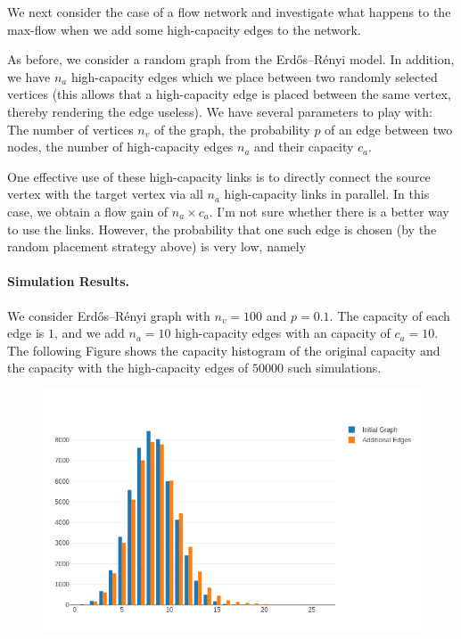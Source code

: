 
We next consider the case of a flow network and investigate what happens to the max-flow when we add some high-capacity edges to the network.

As before, we consider a random graph from the Erdős–Rényi model. In addition, we have $n_a$ high-capacity edges which we place between two randomly selected vertices (this allows that a high-capacity edge is placed between the same vertex, thereby rendering the edge useless). We have several parameters to play with: The number of vertices $n_v$ of the graph, the probability $p$ of an edge between two nodes, the number of high-capacity edges $n_a$ and their capacity $c_a$.

One effective use of these high-capacity links is to directly connect the source vertex with the target vertex via all $n_a$ high-capacity links in parallel. In this case, we obtain a flow gain of $n_a \times c_a$. I'm not sure whether there is a better way to use the links. However, the probability that one such edge is chosen (by the random placement strategy above) is very low, namely

\bee
{}
\eee

\paragraph{Simulation Results.} We consider Erdős–Rényi graph with $n_v=100$ and $p=0.1$. The capacity of each edge is $1$, and we add $n_a=10$ high-capacity edges with an capacity of $c_a = 10$. The following Figure shows the capacity histogram of the original capacity and the capacity with the high-capacity edges of $50000$ such simulations.

\begin{figure}[H]
\centering
\includegraphics[scale=0.55]{images/max_flow_05_01.png}
\end{figure}

